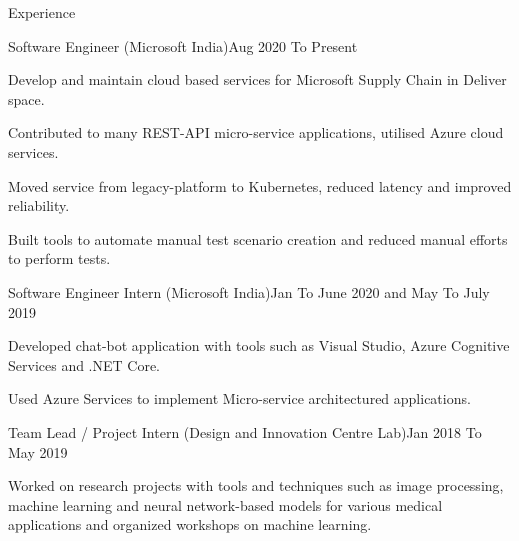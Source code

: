 \documentclass{resume} %
\begin{document}




    \begin{rSection}{Experience}

        \begin{rSubsection}{Software Engineer (Microsoft India)}{Aug 2020 To Present}{}{}

            \item Develop and maintain cloud based services for Microsoft Supply Chain in Deliver space.
            \item Contributed to many REST-API micro-service applications, utilised Azure cloud services.
            \item Moved service from legacy-platform to Kubernetes, reduced latency and improved reliability.
            \item Built tools to automate manual test scenario creation and reduced manual efforts to perform tests.
            
        \end{rSubsection}


        \begin{rSubsection}{Software Engineer Intern (Microsoft India)}{Jan To June 2020 and May To July 2019}{}{}

            \item Developed chat-bot application with tools such as Visual Studio, Azure Cognitive Services and .NET Core.
            \item Used Azure Services to implement Micro-service architectured applications.
            
        \end{rSubsection}


        \begin{rSubsection}{Team Lead / Project Intern (Design and Innovation Centre Lab)}{Jan 2018 To May 2019}{}{}

            \item Worked on research projects with tools and techniques such as image processing, machine learning and neural network-based models for various medical applications and organized workshops on machine learning.

        \end{rSubsection}

    \end{rSection}
\end{document}

